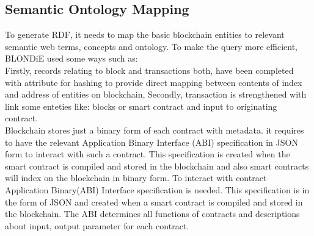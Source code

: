 \subsection{Semantic Ontology Mapping}
To generate RDF, it needs to map the basic blockchain entities to relevant semantic web terms, concepts and ontology. To make the query more efficient, BLONDiE used some ways such as: \\  
Firstly, records relating to block and transactions both, have been completed with attribute for hashing to provide direct mapping between contents of index and address of entities on blockchain, Secondly, transaction is strengthened with link some enteties like: blocks or smart contract and input to originating contract.\\
Blockchain stores just a binary form of each contract with metadata.   
it requires to have the relevant Application Binary Interface (ABI) specification in JSON form to interact with such a contract. This specification is created when the smart contract is compiled and stored in the blockchain and also smart contracts will index on the blockchain in binary form. To interact with contract Application Binary(ABI) Interface specification is needed. This specification is in the form of JSON and created when a smart contract is compiled and stored in the blockchain. The ABI determines all functions of contracts and descriptions about input, output parameter for each contract\cite{Third}.


